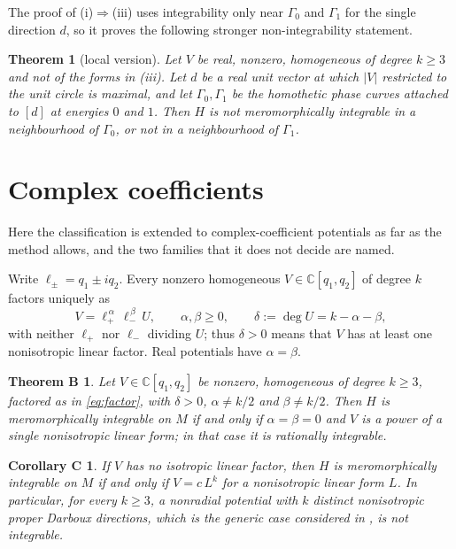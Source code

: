 \documentclass[11pt]{article}
\numberwithin{equation}{section}
\newtheorem{theorem}{Theorem}[section]
\newtheorem*{theoremB}{Theorem B}
\newtheorem*{corollaryC}{Corollary C}
\theoremstyle{definition}
\theoremstyle{remark}
\newcommand{\C}{\mathbb C}
\begin{document}
The proof of (i)$\Rightarrow$(iii) uses integrability only near $\Gamma_0$ and $\Gamma_1$ for the single direction
$d$, so it proves the following stronger non-integrability statement.

\begin{theorem}[local version]\label{thm:local}
Let $V$ be real, nonzero, homogeneous of degree $k\ge3$ and not of the forms in (iii). Let $d$ be a real unit vector at
which $|V|$ restricted to the unit circle is maximal, and let $\Gamma_0,\Gamma_1$ be the homothetic phase curves
attached to $[d]$ at energies $0$ and $1$. Then $H$ is not meromorphically integrable in a neighbourhood of
$\Gamma_0$, or not in a neighbourhood of $\Gamma_1$.
\end{theorem}

\section{Complex coefficients}\label{sec:complex}

Here the classification is extended to complex-coefficient potentials as far as the method allows, and the two
families that it does not decide are named.

Write $\ell_\pm=q_1\pm iq_2$. Every nonzero homogeneous $V\in\C[q_1,q_2]$ of degree $k$ factors uniquely as
\begin{equation}\label{eq:factor}
V=\ell_+^{\,\alpha}\,\ell_-^{\,\beta}\,U,\qquad \alpha,\beta\ge0,\qquad \delta:=\deg U=k-\alpha-\beta,
\end{equation}
with neither $\ell_+$ nor $\ell_-$ dividing $U$; thus $\delta>0$ means that $V$ has at least one nonisotropic linear
factor. Real potentials have $\alpha=\beta$.

\begin{theoremB}
Let $V\in\C[q_1,q_2]$ be nonzero, homogeneous of degree $k\ge3$, factored as in \eqref{eq:factor}, with $\delta>0$,
$\alpha\ne k/2$ and $\beta\ne k/2$. Then $H$ is meromorphically integrable on $M$ if and only if $\alpha=\beta=0$ and
$V$ is a power of a single nonisotropic linear form; in that case it is rationally integrable.
\end{theoremB}

\begin{corollaryC}
If $V$ has no isotropic linear factor, then $H$ is meromorphically integrable on $M$ if and only if $V=c\,L^k$ for a
nonisotropic linear form $L$. In particular, for every $k\ge3$, a nonradial potential with $k$ distinct nonisotropic
proper Darboux directions, which is the generic case considered in \cite[Sec.~VI]{PSM23}, is not integrable.
\end{corollaryC}
\end{document}
